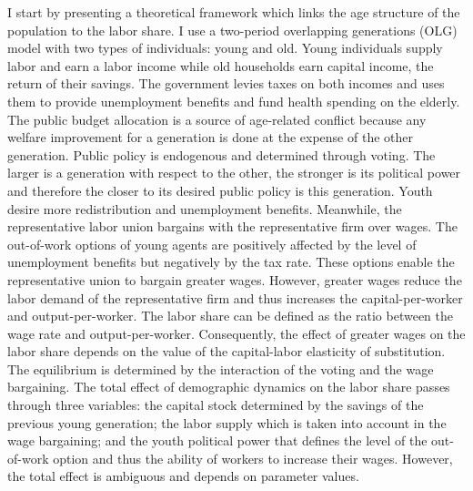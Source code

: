 I start by presenting a theoretical framework which links the age structure of the population to the labor share. I use a two-period overlapping generations (OLG) model with two types of individuals: young and old. Young individuals supply labor and earn a labor income while old households earn capital income, the return of their savings.
The government levies taxes on both incomes and uses them to provide unemployment benefits and fund health spending on the elderly. The public budget allocation is a source of age-related conflict because any welfare improvement for a generation is done at the expense of the other generation. Public policy is endogenous and determined through voting. The larger is a generation with respect to the other, the stronger is its political power and therefore the closer to its desired public policy is this generation. Youth desire more redistribution and unemployment benefits.
Meanwhile, the representative labor union bargains with the representative firm over wages. The out-of-work options of young agents are positively affected by the level of unemployment benefits but negatively by the tax rate. These options enable the representative union to bargain greater wages. However, greater wages reduce the labor demand of the representative firm and thus increases the capital-per-worker and output-per-worker. The labor share can be defined as the ratio between the wage rate and output-per-worker. Consequently, the effect of greater wages on the labor share depends on the value of the capital-labor elasticity of substitution.
The equilibrium is determined by the interaction of the voting and the wage bargaining. The total effect of demographic dynamics on the labor share passes through three variables: the capital stock determined by the savings of the previous young generation; the labor supply which is taken into account in the wage bargaining; and the youth political power that defines the level of the out-of-work option and thus the ability of workers to increase their wages. However, the total effect is ambiguous and depends on parameter values.

